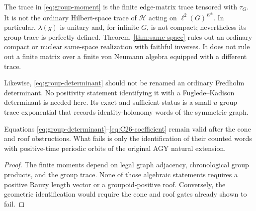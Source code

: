 The trace in \eqref{eq:group-moment} is the finite edge-matrix trace tensored
with $\tau_G$.  It is not the ordinary Hilbert-space trace of $\mathcal H$
acting on $\ell^2(G)^{E^\pm}$.  In particular, $\lambda(g)$ is unitary and,
for infinite $G$, is not compact; nevertheless its group trace is perfectly
defined.  Theorem~\ref{thm:same-space} rules out an ordinary compact or
nuclear same-space realization with faithful inverses.  It does not rule out
a finite matrix over a finite von Neumann algebra equipped with a different
trace.

Likewise, \eqref{eq:group-determinant} should not be renamed an ordinary
Fredholm determinant.  No positivity statement identifying it with a
Fuglede--Kadison determinant is needed here.  Its exact and sufficient status
is a small-$u$ group-trace exponential that records identity-holonomy words
of the symmetric graph.

\begin{proposition}
\label{prop:finite-survives}
Equations \eqref{eq:group-determinant}--\eqref{eq:C26-coefficient} remain
valid after the cone and roof obstructions.  What fails is only the
identification of their counted words with positive-time periodic orbits of
the original AGY natural extension.
\end{proposition}

\begin{proof}
The finite moments depend on legal graph adjacency, chronological group
products, and the group trace.  None of those algebraic statements requires a
positive Rauzy length vector or a groupoid-positive roof.  Conversely, the
geometric identification would require the cone and roof gates already shown
to fail.
\end{proof}
